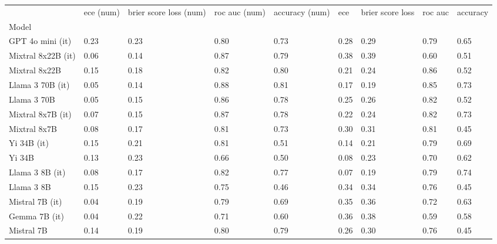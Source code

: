 \begin{tabular}{lllllllll}
\toprule
 & ece (num) & brier score loss (num) & roc auc (num) & accuracy (num) & ece & brier score loss & roc auc & accuracy \\
Model &  &  &  &  &  &  &  &  \\
\midrule
GPT 4o mini (it) & 0.23 & 0.23 & 0.80 & 0.73 & 0.28 & 0.29 & 0.79 & 0.65 \\
Mixtral 8x22B (it) & 0.06 & \cellcolor{cyan!21.9} 0.14 & \cellcolor{cyan!24.4} 0.87 & \cellcolor{cyan!16.5} 0.79 & \cellcolor{orange!23.0} 0.38 & \cellcolor{orange!8.0} 0.39 & 0.60 & 0.51 \\
Mixtral 8x22B & 0.15 & 0.18 & 0.82 & \cellcolor{cyan!20.7} 0.80 & 0.21 & 0.24 & \cellcolor{cyan!25.0} 0.86 & 0.52 \\
Llama 3 70B (it) & \cellcolor{cyan!0.7} 0.05 & \cellcolor{cyan!25.0} 0.14 & \cellcolor{cyan!25.0} 0.88 & \cellcolor{cyan!25.0} 0.81 & 0.17 & \cellcolor{cyan!17.1} 0.19 & \cellcolor{cyan!23.3} 0.85 & \cellcolor{cyan!15.4} 0.73 \\
Llama 3 70B & 0.05 & \cellcolor{cyan!16.7} 0.15 & \cellcolor{cyan!13.6} 0.86 & \cellcolor{cyan!5.8} 0.78 & 0.25 & 0.26 & \cellcolor{cyan!2.3} 0.82 & 0.52 \\
Mixtral 8x7B (it) & 0.07 & \cellcolor{cyan!16.7} 0.15 & \cellcolor{cyan!23.2} 0.87 & \cellcolor{cyan!7.2} 0.78 & 0.22 & 0.24 & \cellcolor{cyan!6.8} 0.82 & \cellcolor{cyan!13.7} 0.73 \\
Mixtral 8x7B & 0.08 & 0.17 & 0.81 & 0.73 & 0.30 & 0.31 & \cellcolor{cyan!1.1} 0.81 & \cellcolor{orange!24.1} 0.45 \\
Yi 34B (it) & 0.15 & 0.21 & 0.81 & 0.51 & 0.14 & 0.21 & 0.79 & 0.69 \\
Yi 34B & 0.13 & 0.23 & 0.66 & 0.50 & 0.08 & 0.23 & 0.70 & 0.62 \\
Llama 3 8B (it) & 0.08 & 0.17 & 0.82 & 0.77 & 0.07 & \cellcolor{cyan!25.0} 0.19 & 0.79 & \cellcolor{cyan!25.0} 0.74 \\
Llama 3 8B & 0.15 & 0.23 & 0.75 & \cellcolor{orange!25.0} 0.46 & 0.34 & 0.34 & 0.76 & \cellcolor{orange!25.0} 0.45 \\
Mistral 7B (it) & \cellcolor{cyan!7.4} 0.04 & 0.19 & 0.79 & 0.69 & \cellcolor{orange!6.6} 0.35 & 0.36 & 0.72 & 0.63 \\
Gemma 7B (it) & \cellcolor{cyan!8.8} 0.04 & 0.22 & 0.71 & 0.60 & \cellcolor{orange!10.0} 0.36 & 0.38 & 0.59 & 0.58 \\
Mistral 7B & 0.14 & 0.19 & 0.80 & \cellcolor{cyan!12.9} 0.79 & 0.26 & 0.30 & 0.76 & \cellcolor{orange!25.0} 0.45 \\

\end{tabular}
